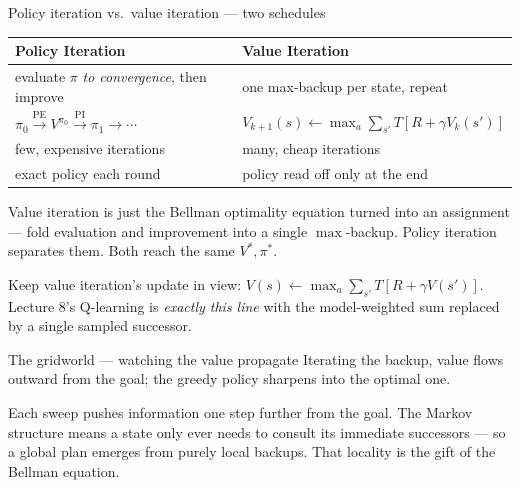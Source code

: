 \documentclass[10pt, aspectratio=169]{beamer}
\begin{document}
\begin{frame}{Policy iteration vs.\ value iteration --- two schedules}
\begin{center}\footnotesize\renewcommand{\arraystretch}{1.4}
\begin{tabular}{l|l}
\textbf{Policy Iteration} & \textbf{Value Iteration} \\
\hline
evaluate $\pi$ \emph{to convergence}, then improve & one max-backup per state, repeat \\
$\pi_0 \xrightarrow{\text{PE}} V^{\pi_0} \xrightarrow{\text{PI}} \pi_1 \to \cdots$ & $V_{k+1}(s)\leftarrow \max_a\sum_{s'}T[R+\gamma V_k(s')]$ \\
few, expensive iterations & many, cheap iterations \\
exact policy each round & policy read off only at the end \\
\end{tabular}
\end{center}
\medskip

\pause
Value iteration is just the \alert{Bellman optimality equation turned into an assignment} --- fold evaluation and improvement into a single $\max$-backup. Policy iteration separates them. Both reach the same $V^*,\pi^*$.
\medskip

\pause
{\footnotesize\textcolor{mLightBrown}{Keep value iteration's update in view: $V(s)\leftarrow\max_a\sum_{s'}T[R+\gamma V(s')]$. Lecture 8's Q-learning is \emph{exactly this line} with the model-weighted sum replaced by a single sampled successor.}}
\end{frame}

\begin{frame}{The gridworld --- watching the value propagate}
Iterating the backup, value flows outward from the goal; the greedy policy sharpens into the optimal one.
\medskip
\begin{center}
\end{center}
\medskip

\pause
Each sweep pushes information one step further from the goal. The Markov structure means a state only ever needs to consult its immediate successors --- so a global plan emerges from \alert{purely local backups}. That locality is the gift of the Bellman equation.
\end{frame}
\end{document}
